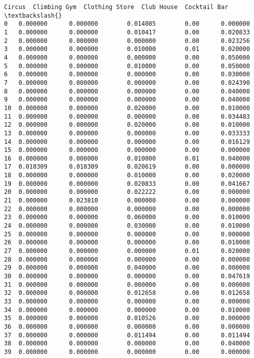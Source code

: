 \documentclass[11pt]{article}
\begin{document}
\begin{tcolorbox}[breakable, size=fbox, boxrule=.5pt, pad at break*=1mm, opacityfill=0]
\begin{Verbatim}[commandchars=\\\{\}]
      Circus  Climbing Gym  Clothing Store  Club House  Cocktail Bar  \textbackslash{}
0   0.000000      0.000000        0.014085        0.00      0.000000
1   0.000000      0.000000        0.010417        0.00      0.020833
2   0.000000      0.000000        0.000000        0.00      0.023256
3   0.000000      0.000000        0.010000        0.01      0.020000
4   0.000000      0.000000        0.000000        0.00      0.050000
5   0.000000      0.000000        0.010000        0.00      0.050000
6   0.000000      0.000000        0.000000        0.00      0.030000
7   0.000000      0.000000        0.000000        0.00      0.024390
8   0.000000      0.000000        0.000000        0.00      0.040000
9   0.000000      0.000000        0.000000        0.00      0.040000
10  0.000000      0.000000        0.020000        0.00      0.010000
11  0.000000      0.000000        0.000000        0.00      0.034483
12  0.000000      0.000000        0.020000        0.00      0.010000
13  0.000000      0.000000        0.000000        0.00      0.033333
14  0.000000      0.000000        0.000000        0.00      0.016129
15  0.000000      0.000000        0.000000        0.00      0.000000
16  0.000000      0.000000        0.010000        0.01      0.040000
17  0.010309      0.010309        0.020619        0.00      0.000000
18  0.000000      0.000000        0.010000        0.00      0.020000
19  0.000000      0.000000        0.020833        0.00      0.041667
20  0.000000      0.000000        0.022222        0.00      0.000000
21  0.000000      0.023810        0.000000        0.00      0.000000
22  0.000000      0.000000        0.000000        0.00      0.000000
23  0.000000      0.000000        0.060000        0.00      0.010000
24  0.000000      0.000000        0.030000        0.00      0.010000
25  0.000000      0.000000        0.000000        0.00      0.000000
26  0.000000      0.000000        0.000000        0.00      0.010000
27  0.000000      0.000000        0.000000        0.01      0.020000
28  0.000000      0.000000        0.000000        0.00      0.000000
29  0.000000      0.000000        0.040000        0.00      0.000000
30  0.000000      0.000000        0.000000        0.00      0.047619
31  0.000000      0.000000        0.000000        0.00      0.000000
32  0.000000      0.000000        0.012658        0.00      0.012658
33  0.000000      0.000000        0.000000        0.00      0.000000
34  0.000000      0.000000        0.000000        0.00      0.010000
35  0.000000      0.000000        0.010526        0.00      0.000000
36  0.000000      0.000000        0.000000        0.00      0.000000
37  0.000000      0.000000        0.011494        0.00      0.011494
38  0.000000      0.000000        0.000000        0.00      0.040000
39  0.000000      0.000000        0.000000        0.00      0.000000


\end{Verbatim}
\end{tcolorbox}
\end{document}
